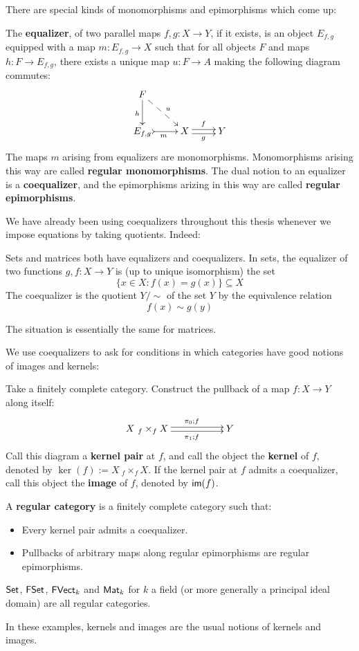 There are  special kinds of monomorphisms and epimorphisms which come up:
\begin{definition}
The {\bf equalizer}, of two parallel maps $f,g:X\to Y$, if it exists, is an object $E_{f,g}$ equipped with a map $m:E_{f,g}\to X$ such that for all objects $F$ and maps $h:F\to E_{f,g}$, there exists a unique map $u:F\to A$ making the following diagram commutes:
$$
\xymatrix{
    F \ar@{-->}[dr]^{u} \ar[d]_h
  \\ E_{f,g} \ar@{>->}[r]_m
    & X \ar@<-.5ex>[r]_g \ar@<.5ex>[r]^f
    & Y
}
$$
The maps $m$ arising from equalizers are monomorphisms.  Monomorphisms arising this way are called {\bf regular monomorphisms}.
The dual notion to an equalizer is a {\bf coequalizer}, and the epimorphisms arizing in this way are called {\bf regular epimorphisms}.
\end{definition}
We have already been using coequalizers throughout this thesis whenever we impose equations by taking quotients.  Indeed:
\begin{example}
Sets and matrices both have equalizers and coequalizers.
In sets, the equalizer of two functions $g,f:X\to Y$ is (up to unique isomorphism) the set 
$$\{x \in X:f(x)=g(x)\} \subseteq X$$
The coequalizer is the quotient $Y/\sim$   of the set $Y$ by the equivalence relation 
$$f(x)\sim g(y)$$

The situation is essentially the same for matrices.
\end{example}
We  use coequalizers to ask for conditions in which categories have good notions of images and kernels:
\begin{definition}
Take a finitely complete category.  Construct the pullback of a map $f:X\to Y$ along itself:
 $$\xymatrix{X\ {}_f \times_f X  \ar@<-.5ex>[rr]_{\ \ \pi_1;f}  \ar@<.5ex>[rr]^{\ \ \pi_0;f}&& Y}$$
Call this diagram a {\bf kernel pair} at $f$, and call the object  the {\bf kernel} of $f$, denoted by $\ker(f):=X\ {}_f \times_f X$.
If the kernel pair at $f$ admits a coequalizer, call this object the {\bf image} of $f$, denoted by $\mathsf{im}(f)$.

A {\bf regular category} is a finitely complete category such that:
\begin{itemize}
\item Every kernel pair admits a coequalizer.
\item Pullbacks of arbitrary maps along regular epimorphisms are regular epimorphisms.
\end{itemize}
\end{definition}
\begin{example}
$\mathsf{Set}$, $\mathsf{FSet}$, $\mathsf{FVect}_k$ and  $\mathsf{Mat}_k$ for $k$ a field (or more generally a principal ideal domain) are all regular categories.

In these examples, kernels and images are the usual notions of kernels and images.
\end{example}
